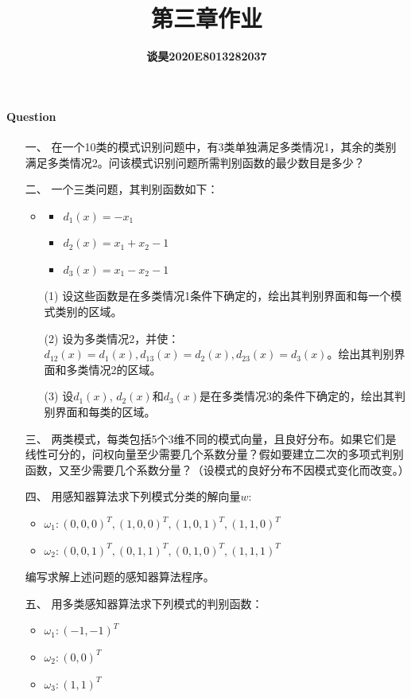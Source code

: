 \documentclass[UTF8,a4paper]{ctexart}
\title{\bfseries 第三章作业 }
\author{\bfseries 谈昊\quad2020E8013282037}
\date{}
\begin{document}
\maketitle

\paragraph{Question}
\begin{itemize}
    \item[一、] 在一个10类的模式识别问题中，有3类单独满足多类情况1，其余的类别满足多类情况2。问该模式识别问题所需判别函数的最少数目是多少？
    \item[二、]
    一个三类问题，其判别函数如下：
    \begin{itemize}
        \item
    \begin{itemize}
        \item $d_1(x)=-x_1$
        \item $d_2(x)=x_1+x_2-1$
        \item $d_3(x)=x_1-x_2-1$
    \end{itemize}
    \item[(1)]设这些函数是在多类情况1条件下确定的，绘出其判别界面和每一个模式类别的区域。
    \item[(2)]设为多类情况2，并使：$d_{12}(x)= d_1(x), d_{13}(x)= d_2(x), d_{23}(x)= d_3(x)$。绘出其判别界面和多类情况2的区域。 
    \item[(3)]设$d_1(x)$, $d_2(x)$和$d_3(x)$是在多类情况3的条件下确定的，绘出其判别界面和每类的区域。
    \end{itemize}
    \item[三、] 两类模式，每类包括5个3维不同的模式向量，且良好分布。如果它们是线性可分的，问权向量至少需要几个系数分量？假如要建立二次的多项式判别函数，又至少需要几个系数分量？（设模式的良好分布不因模式变化而改变。）
    \item[四、] 用感知器算法求下列模式分类的解向量$w$:
        \begin{itemize}
            \item $\omega _1: {(0,0,0)^T, (1,0,0)^T, (1,0,1)^T, (1,1,0)^T}$
            \item $\omega _2: {(0,0,1)^T, (0,1,1)^T, (0,1,0)^T, (1,1,1)^T}$
        \end{itemize}
编写求解上述问题的感知器算法程序。


        
    \item[五、] 用多类感知器算法求下列模式的判别函数：
    \begin{itemize}
        \item $\omega _1: (-1 ,-1)^T$
        \item $\omega _2: (0, 0)^T$
        \item $\omega _3: (1 ,1)^T$
        

\end{itemize}
\end{itemize}
\end{document}
